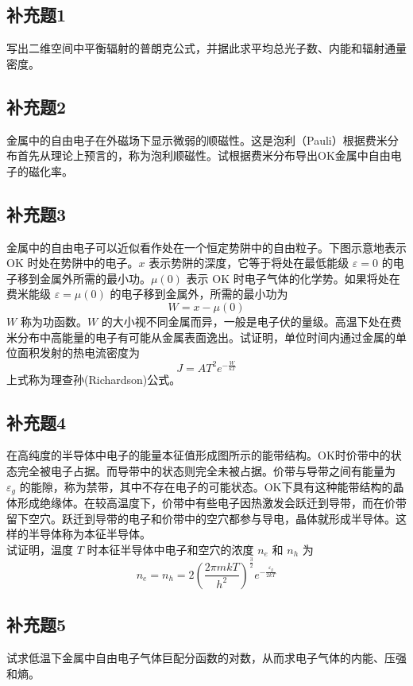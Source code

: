 \newpage
\subsection{补充题1}
写出二维空间中平衡辐射的普朗克公式，并据此求平均总光子数、内能和辐射通量密度。

\newpage
\subsection{补充题2}
金属中的自由电子在外磁场下显示微弱的顺磁性。这是泡利（Pauli）根据费米分布首先从理论上预言的，称为泡利顺磁性。试根据费米分布导出OK金属中自由电子的磁化率。

\newpage
\subsection{补充题3}
金属中的自由电子可以近似看作处在一个恒定势阱中的自由粒子。下图示意地表示 OK 时处在势阱中的电子。$x$ 表示势阱的深度，它等于将处在最低能级 $\varepsilon = 0$ 的电子移到金属外所需的最小功。$\mu(0)$ 表示 OK 时电子气体的化学势。如果将处在费米能级 $\varepsilon = \mu(0)$ 的电子移到金属外，所需的最小功为
$$ W = x - \mu(0) $$
$W$ 称为功函数。$W$ 的大小视不同金属而异，一般是电子伏的量级。高温下处在费米分布中高能量的电子有可能从金属表面逸出。试证明，单位时间内通过金属的单位面积发射的热电流密度为
$$ J = AT^2 e^{-\frac{W}{kT}} $$
上式称为理查孙(Richardson)公式。

\newpage
\subsection{补充题4}
在高纯度的半导体中电子的能量本征值形成图所示的能带结构。OK时价带中的状态完全被电子占据。而导带中的状态则完全未被占据。价带与导带之间有能量为 $\varepsilon_g$ 的能隙，称为禁带，其中不存在电子的可能状态。OK下具有这种能带结构的晶体形成绝缘体。在较高温度下，价带中有些电子因热激发会跃迁到导带，而在价带留下空穴。跃迁到导带的电子和价带中的空穴都参与导电，晶体就形成半导体。这样的半导体称为本征半导体。\\
试证明，温度 $T$ 时本征半导体中电子和空穴的浓度 $n_e$ 和 $n_h$ 为
$$ n_e = n_h = 2\left(\frac{2\pi mkT}{h^2}\right)^{\frac{3}{2}} e^{-\frac{\varepsilon_g}{2kT}} $$

\newpage
\subsection{补充题5}
试求低温下金属中自由电子气体巨配分函数的对数，从而求电子气体的内能、压强和熵。